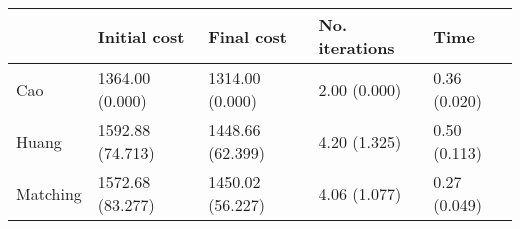 \begin{tabular}{lllll}
\toprule
{} &      Initial cost &        Final cost & No. iterations &          Time \\
\midrule
Cao      &   1364.00 (0.000) &   1314.00 (0.000) &   2.00 (0.000) &  0.36 (0.020) \\
Huang    &  1592.88 (74.713) &  1448.66 (62.399) &   4.20 (1.325) &  0.50 (0.113) \\
Matching &  1572.68 (83.277) &  1450.02 (56.227) &   4.06 (1.077) &  0.27 (0.049) \\
\bottomrule
\end{tabular}
